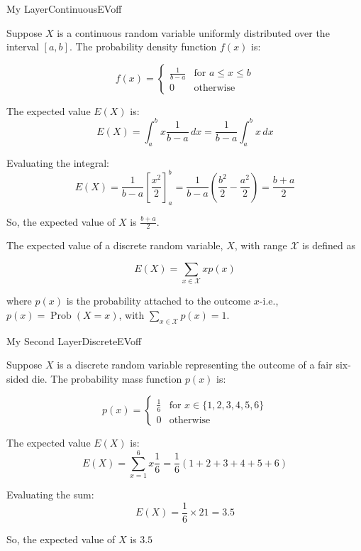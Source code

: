 \begin{ocg}{My Layer}{ContinuousEV}{off}

Suppose \( X \) is a continuous random variable uniformly distributed over the interval \([a, b]\). The probability density function \( f(x) \) is: 

\[ f(x) = \begin{cases} \frac{1}{b-a} & \text{for } a \leq x \leq b \\ 0 & \text{otherwise} \end{cases} \] 

The expected value \( E(X) \) is: \[ E(X) = \int_{a}^{b} x \frac{1}{b-a} \, dx = \frac{1}{b-a} \int_{a}^{b} x \, dx \] 

Evaluating the integral: \[ E(X) = \frac{1}{b-a} \left[ \frac{x^2}{2} \right]_{a}^{b} = \frac{1}{b-a} \left( \frac{b^2}{2} - \frac{a^2}{2} \right) = \frac{b+a}{2} \] 

So, the expected value of \( X \) is \( \frac{b+a}{2} \).
\end{ocg}

\begin{definition}
    The expected value of a discrete random variable, $X$, with range $\mathcal{X}$ is defined as
    
    $$
    E(X)=\sum_{x \in \mathcal{X}} x p(x)
    $$
    
    where $p(x)$ is the probability attached to the outcome $x$-i.e., $p(x)=\operatorname{Prob}(X=x)$, with $\sum_{x \in \mathcal{X}} p(x)=1$.
\end{definition}
 
\begin{ocg}{My Second Layer}{DiscreteEV}{off}

    Suppose \( X \) is a discrete random variable representing the outcome of a fair six-sided die. The probability mass function \( p(x) \) is: 
    
    \[ p(x) = \begin{cases} \frac{1}{6} & \text{for } x \in \{1, 2, 3, 4, 5, 6\} \\ 0 & \text{otherwise} \end{cases} \] 
    
    The expected value \( E(X) \) is: \[ E(X) = \sum_{x=1}^{6} x \frac{1}{6} = \frac{1}{6} (1 + 2 + 3 + 4 + 5 + 6) \] 
    
    Evaluating the sum: \[ E(X) = \frac{1}{6} \times 21 = 3.5 \] 
    
    So, the expected value of \( X \) is \( 3.5 \)
\end{ocg}

